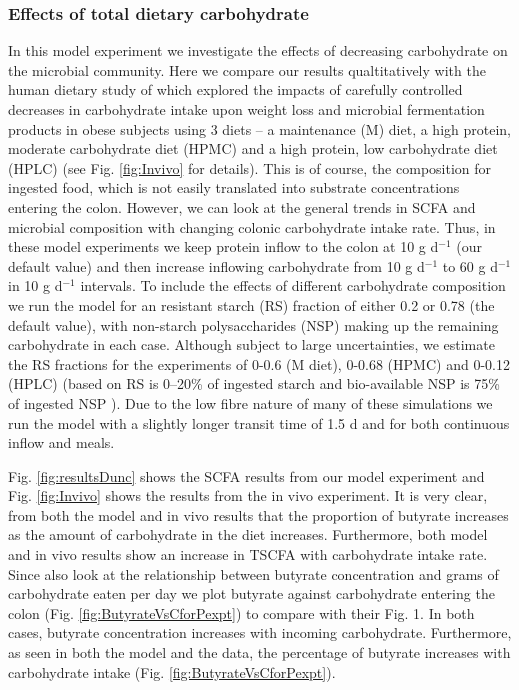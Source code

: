 \documentclass[a4paper]{article}
\begin{document}
\subsubsection*{Effects of total dietary carbohydrate}
\label{sect:protein}
In this model experiment we investigate the effects of decreasing carbohydrate on the microbial community. 
Here we compare our results qualtitatively with the human dietary study of \cite{duncan} which explored the impacts of carefully controlled decreases in carbohydrate intake upon weight loss and microbial fermentation products in obese subjects using 3 diets -- a maintenance (M) diet, a high protein, moderate carbohydrate diet (HPMC) and a high protein, low carbohydrate diet (HPLC) (see Fig. \ref{fig:Invivo} for details).
This is of course, the composition for ingested food, which is not easily translated into substrate concentrations entering the colon. 
However, we can look at the general trends in SCFA and microbial composition with changing colonic carbohydrate intake rate.
Thus, in these model experiments we keep protein inflow to the colon at 10 g d$^{-1}$ (our default value) and then increase inflowing carbohydrate from 10 g d$^{-1}$ to 60 g d$^{-1}$ in 10 g d$^{-1}$ intervals. 
To include the effects of different carbohydrate composition we run the model for an resistant starch (RS) fraction of either 0.2 or 0.78 (the default value), with non-starch polysaccharides (NSP) making up the remaining carbohydrate in each case. 
Although subject to large uncertainties, we estimate the RS fractions for the \cite{duncan} experiments of 0-0.6 (M diet), 0-0.68 (HPMC) and 0-0.12 (HPLC) (based on RS is 0--20\% of ingested starch \citep{capuano} and bio-available NSP is 75\% of ingested NSP \citep{slavin}).
Due to the low fibre nature of many of these simulations we run the model with a slightly longer transit time of 1.5 d and for both continuous inflow and meals.


Fig. \ref{fig:resultsDunc} shows the SCFA results from our model experiment and Fig. \ref{fig:Invivo} shows the results from the in vivo experiment. 
It is very clear, from both the model and in vivo results that the proportion of butyrate increases as the amount of carbohydrate in the diet increases. Furthermore, both model and in vivo results show an increase in TSCFA with carbohydrate intake rate. 
Since \cite{duncan} also look at the relationship between butyrate concentration and grams of carbohydrate eaten per day we plot butyrate against carbohydrate entering the colon (Fig. \ref{fig:ButyrateVsCforPexpt}) to compare with their Fig. 1. 
In both cases, butyrate concentration increases with incoming carbohydrate.
Furthermore, as seen in both the model and the data, the percentage of butyrate increases with carbohydrate intake (Fig. \ref{fig:ButyrateVsCforPexpt}). 
\end{document}
